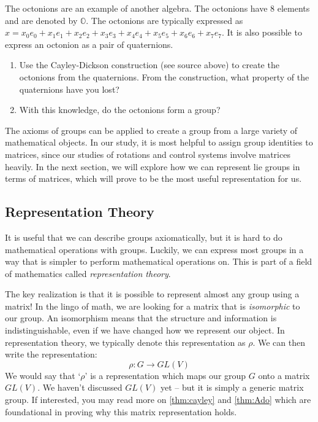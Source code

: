 \begin{exercise}

The octonions are an example of another algebra. The octonions have 8 elements and are denoted by $\mathbb{O}$. The octonions are typically expressed as $x=x_0e_0+x_1e_1+x_2e_2+x_3e_3+x_4e_4+x_5e_5+x_6e_6+x_7e_7$. It is also possible to express an octonion as a pair of quaternions.

\begin{enumerate}
    \item Use the Cayley-Dickson construction (see source above) to create the octonions from the quaternions. From the construction, what property of the quaternions have you lost?
    \item With this knowledge, do the octonions form a group?

\end{enumerate}
\end{exercise}

The axioms of groups can be applied to create a group from a large variety of mathematical objects. In our study, it is most helpful to assign group identities to matrices, since our studies of rotations and control systems involve matrices heavily. In the next section, we will explore how we can represent \glspl{lie group} in terms of matrices, which will prove to be the most useful representation for us.

\subsection{Representation Theory}
It is useful that we can describe groups axiomatically, but it is hard to do mathematical operations with groups. Luckily, we can express most groups in a way that is simpler to perform mathematical operations on. This is part of a field of mathematics called \textit{representation theory}.

The key realization is that it is possible to represent almost any group using a matrix! In the lingo of math, we are looking for a matrix that is \textit{isomorphic} to our group. An isomorphism means that the structure and information is indistinguishable, even if we have changed how we represent our object. In representation theory, we typically denote this representation as $\rho$. We can then write the representation:
$$\rho:G\rightarrow GL(V)$$
We would say that `$\rho$' is a representation which maps our group $G$ onto a matrix $GL(V)$. We haven't discussed $GL(V)$ yet -- but it is simply a generic matrix group. If interested, you may read more on \autoref{thm:cayley} and \autoref{thm:Ado} which are foundational in proving why this matrix representation holds.

